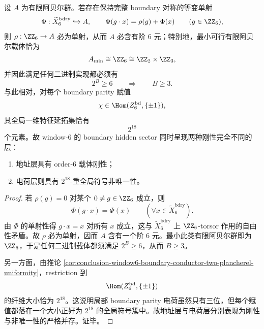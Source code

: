 \begin{theorem}\label{thm:conclusion-window6-boundary-address-rigidity-charge-nonuniqueness}
设 \(A\) 为有限阿贝尔群。若存在保持完整 boundary 对称的等变单射
\[
\Phi:\widetilde X_6^{\mathrm{bdry}}\hookrightarrow A,
\qquad
\Phi(g\cdot x)=\rho(g)+\Phi(x)\qquad (g\in \ZZ_6),
\]
则 \(\rho:\ZZ_6\to A\) 必为单射，从而 \(A\) 必含有阶 \(6\) 元；特别地，最小可行有限阿贝尔载体恰为
\[
A_{\min}\cong \ZZ_6\cong \ZZ_2\times \ZZ_3,
\]
并因此满足任何二进制实现都必须有
\[
2^B\ge 6
\qquad\Longrightarrow\qquad
B\ge 3.
\]
与此相对，对每个 boundary parity 赋值
\[
\chi\in \Hom(Z_6^{\mathrm{bd}},\{\pm1\}),
\]
其全局一维特征延拓集恰有
\[
2^{18}
\]
个元素。故 window-\(6\) 的 boundary hidden sector 同时呈现两种刚性完全不同的层：
\begin{enumerate}
  \item 地址层具有 order-\(6\) 载体刚性；
  \item 电荷层则具有 \(2^{18}\)-重全局符号非唯一性。
\end{enumerate}
\end{theorem}
\begin{proof}
若 \(\rho(g)=0\) 对某个 \(0\neq g\in \ZZ_6\) 成立，则
\[
\Phi(g\cdot x)=\Phi(x)
\qquad (\forall x\in \widetilde X_6^{\mathrm{bdry}}).
\]
由 \(\Phi\) 的单射性得 \(g\cdot x=x\) 对所有 \(x\) 成立，这与 \(\widetilde X_6^{\mathrm{bdry}}\) 上 \(\ZZ_6\)-torsor 作用的自由性矛盾。故 \(\rho\) 必为单射，因而 \(A\) 含有一个阶 \(6\) 元。最小此类有限阿贝尔群即为 \(\ZZ_6\)，于是任何二进制载体都须满足 \(2^B\ge 6\)，从而 \(B\ge 3\)。

另一方面，由推论 \ref{cor:conclusion-window6-boundary-conductor-two-plancherel-uniformity}，restriction 到
\[
\Hom(Z_6^{\mathrm{bd}},\{\pm1\})
\]
的纤维大小恰为 \(2^{18}\)。这说明局部 boundary parity 电荷虽然只有三位，但每个赋值都落在一个大小正好为 \(2^{18}\) 的全局符号簇中。故地址层与电荷层分别表现为刚性与非唯一性的严格并存。证毕。
\end{proof}

